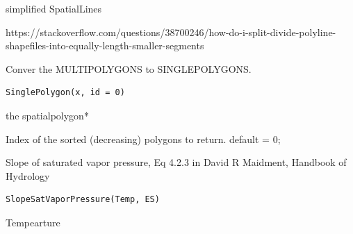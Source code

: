 \documentclass[a4paper]{book}
\begin{document}
%
\begin{Value}
simplified SpatialLines
\end{Value}
%
\begin{Source}\relax
https://stackoverflow.com/questions/38700246/how-do-i-split-divide-polyline-shapefiles-into-equally-length-smaller-segments
\end{Source}
%
\begin{Description}\relax
Conver the MULTIPOLYGONS to SINGLEPOLYGONS.
\end{Description}
%
\begin{Usage}
\begin{verbatim}
SinglePolygon(x, id = 0)
\end{verbatim}
\end{Usage}
%
\begin{Arguments}
\begin{ldescription}
\item[\code{x}] the spatialpolygon*

\item[\code{id}] Index of the sorted (decreasing) polygons to return. default = 0;
\end{ldescription}
\end{Arguments}
%
\begin{Description}\relax
Slope of saturated vapor pressure, Eq 4.2.3 in David R Maidment, Handbook of Hydrology
\end{Description}
%
\begin{Usage}
\begin{verbatim}
SlopeSatVaporPressure(Temp, ES)
\end{verbatim}
\end{Usage}
%
\begin{Arguments}
\begin{ldescription}
\item[\code{Temp}] Tempearture 

\item[\code{ES}] 
\end{ldescription}
\end{Arguments}
\end{document}
